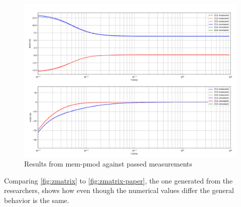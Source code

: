 \begin{figure}[htbp]
    \center
    \includegraphics[width = \textwidth]{img/zmatrix}
    \caption{Results from mem-pmod against passed measurements}
    \label{fig:zmatrix}
\end{figure}


Comparing \autoref{fig:zmatrix} to \autoref{fig:zmatrix-paper}, the one generated from the researchers, shows how even though the numerical values differ the general behavior is the same.
